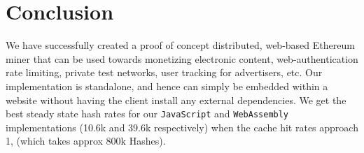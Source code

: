 \documentclass[runningheads]{llncs}
\begin{document}

\section{Conclusion}
\label{sec:conclusion}
We have successfully created a proof of concept distributed, web-based Ethereum miner that can be used towards monetizing electronic content, web-authentication rate limiting, private test networks, user tracking for advertisers, etc. Our implementation is standalone, and hence can simply be embedded within a website without having the client install any external dependencies. We get the best steady state hash rates for our \verb|JavaScript| and \verb|WebAssembly| implementations (10.6k and 39.6k respectively) when the cache hit rates approach 1, (which takes approx 800k Hashes). 

\end{document}

